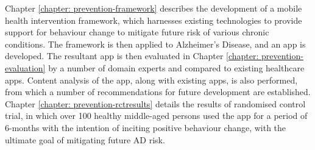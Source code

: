 Chapter \ref{chapter: prevention-framework} describes the development of a mobile health intervention framework, which harnesses existing technologies to provide support for behaviour change to mitigate future risk of various chronic conditions. The framework is then applied to Alzheimer's Disease, and an app is developed. The resultant app is then evaluated in Chapter \ref{chapter: prevention-evaluation} by a number of domain experts and compared to existing healthcare apps. Content analysis of the app, along with existing apps, is also performed, from which a number of recommendations for future development are established. Chapter \ref{chapter: prevention-rctresults} details the results of randomised control trial, in which over 100 healthy middle-aged persons used the app for a period of 6-months with the intention of inciting positive behaviour change, with the ultimate goal of mitigating future AD risk.
